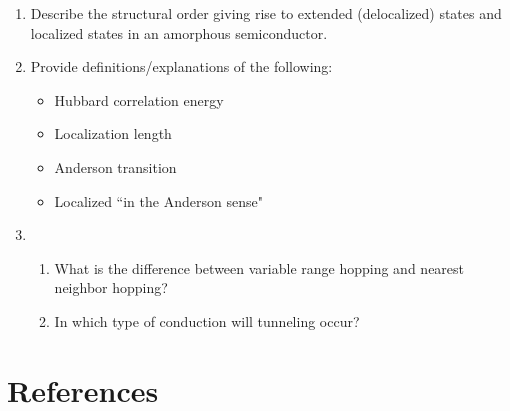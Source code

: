 \documentclass[12pt]{elsarticle}
\begin{document}
\begin{enumerate}
\item Describe the structural order giving rise to extended (delocalized) states and localized states in an amorphous semiconductor.

\item Provide definitions/explanations of the following:
\begin{itemize}
	\item Hubbard correlation energy
	\item Localization length
	\item Anderson transition
	\item Localized ``in the Anderson sense"
\end{itemize}

\item \begin{enumerate}
	\item What is the difference between variable range hopping and nearest neighbor hopping?
	\item In which type of conduction will tunneling occur?
\end{enumerate}

\end{enumerate}

\section*{References}


\end{document}
